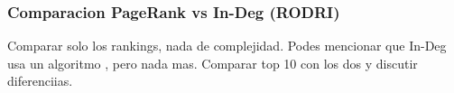 \subsubsection{Comparacion PageRank vs In-Deg (RODRI)}
Comparar solo los rankings, nada de complejidad. Podes mencionar que In-Deg usa un algoritmo , pero nada mas. Comparar top 10 con los dos y discutir diferenciias.